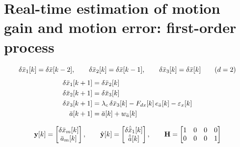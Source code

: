 \clearpage
\section{Real-time estimation of motion gain and motion error: first-order process}

\[
\delta\bar{x}_1[k] = \delta\bar{x}[k-2], \qquad \delta\bar{x}_2[k] = \delta\bar{x}[k-1], \qquad \delta\bar{x}_3[k] = \delta\bar{x}[k] \qquad (d = 2)
\]
\[
\begin{aligned}
\delta\bar{x}_1[k+1] &= \delta\bar{x}_2[k] \\
\delta\bar{x}_2[k+1] &= \delta\bar{x}_3[k] \\
\delta\bar{x}_3[k+1] &= \lambda_c\,\delta\bar{x}_3[k] - F_{dx}[k]\,e_{\bar{a}}[k] - \varepsilon_x[k] \\
\bar{a}[k+1] &= \bar{a}[k] + w_{\bar{a}}[k]
\end{aligned}
\]

\[
\mathbf{y}[k] = \begin{bmatrix} \delta\bar{x}_m[k] \\ \bar{a}_m[k] \end{bmatrix},
\qquad
\hat{\mathbf{y}}[k] = \begin{bmatrix} \delta\hat{\bar{x}}_1[k] \\ \hat{\bar{a}}[k] \end{bmatrix},
\qquad
\mathbf{H} =
\begin{bmatrix}
1 & 0 & 0 & 0 \\
0 & 0 & 0 & 1
\end{bmatrix}
\]

